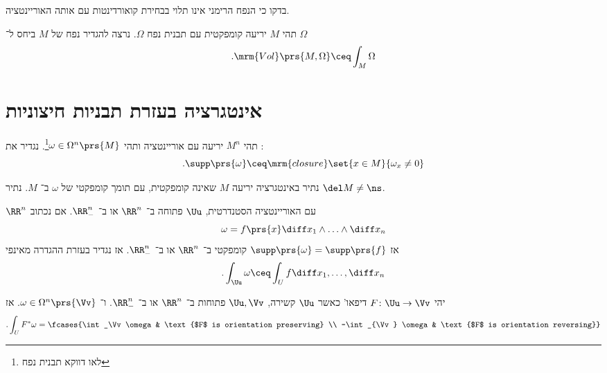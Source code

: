 \documentclass[a4paper,10pt,twoside,openany]{book}
\begin{document}
\begin{exercise}
בדקו כי הנפח הרימני אינו תלוי בבחירת קואורדינטות עם אותה האוריינטציה.
\end{exercise}


תהי
$M$
יריעה קומפקטית עם תבנית נפח
$\Omega$.
נרצה להגדיר
{נפח של
$M$
ביחס ל־%
$\Omega$}
\[\text{.} \mrm{Vol}\prs{M,\Omega} \ceq \int_M \Omega\]

\section{אינטגרציה בעזרת תבניות חיצוניות}
\begin{definition}
תהי
$M^n$
יריעה עם אוריינטציה ותהי
$\omega \in \Omega^n \prs{M}$\footnote{לאו דווקא תבנית נפח}.
נגדיר את
:
\[\text{.} \supp\prs{\omega} \ceq \mrm{closure}\set{x \in M}{\omega_x \neq 0}\]
\end{definition}

נתיר באינטגרציה יריעה
$M$
שאינה קומפקטית, עם תומך קומפקטי של
$\omega$
ב־%
$M$.
נתיר
$\del M \neq \ns$.

\begin{definition}
$\RR^n$
עם האוריינטציה הסטנדרטית,
$\Uu$
פתוחה ב־%
$\RR^n$
או ב־%
$\RR^n_-$.
אם נכתוב
\[\omega = f\prs{x} \diff x_1 \wedge \ldots \wedge \diff x_n\]
אז
$\supp\prs{\omega} = \supp\prs{f}$
קומפקטי ב־%
$\RR^n$
או ב־%
$\RR^n_-$.
אז נגדיר בעזרת ההגדרה מאינפי
\[\text{.} \int_{\Uu} \omega \ceq \int_U f \diff x_1, \ldots, \diff x_n\]
\end{definition}

\begin{proposition}
יהי
$F \colon \Uu \to \Vv$
דיפאו' כאשר
$\Uu$
קשירה,
$\Uu, \Vv$
פתוחות ב־%
$\RR^n$
או
 ב־%
$\RR^n_-$.
ו־%
$\omega \in \Omega^n \prs{\Vv}$.
אז
\[\text{.} \int_U F^* \omega = \fcases{\int_\Vv \omega & \text{$F$ is orientation preserving} \\ -\int_{\Vv} \omega & \text{$F$ is orientation reversing}}\]
\end{proposition}
\end{document}
